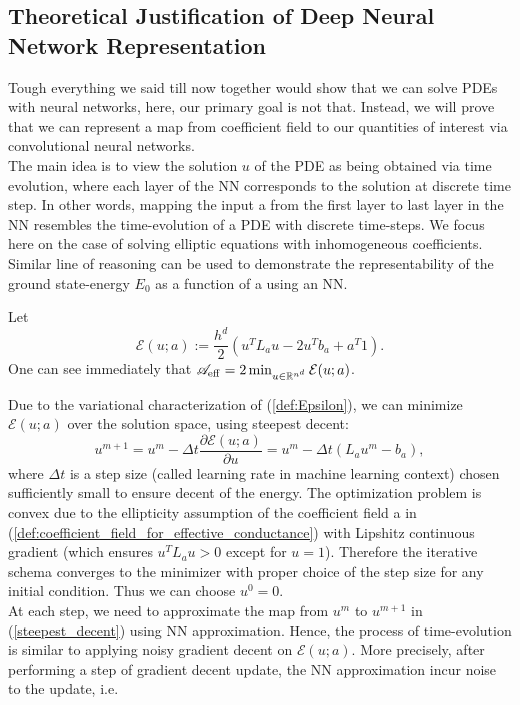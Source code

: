 \subsection{Theoretical Justification of Deep Neural Network Representation}
Tough everything we said till now together would show that we can solve PDEs with neural networks, here, our primary goal is not that. Instead, we will prove that we can represent a map from coefficient field to our quantities of interest via convolutional neural networks.\\
The main idea is to view the solution $u$ of the PDE as being obtained via time evolution, where each layer of the NN corresponds to the solution at discrete time step. In other words, mapping the input a from the first layer to last layer in the NN resembles the time-evolution of a PDE with discrete time-steps. We focus here on the case of solving elliptic equations with inhomogeneous coefficients. Similar line of reasoning can be used to demonstrate the representability of the ground state-energy $E_0$ as a function of a using an NN.
\begin{notation}
	Let 
	\begin{equation}
	\label{def:Epsilon}
	\mathcal{E}(u;a) := \frac{h^d}{2} (u^T L_a u - 2u^T b_a + a^T 1).
	\end{equation} 
	One can see immediately that $\mathscr{A}_{\operatorname{eff}} = 2 \min_{u\in \mathbb{R}^{n^d}} \mathcal{E}(u;a)$.
\end{notation} 
Due to the variational characterization of (\ref{def:Epsilon}), we can minimize $\mathcal{E}(u;a)$ over the solution space, using steepest decent:
\begin{equation}
\label{steepest_decent}
u^{m+1} = u^m - \Delta t \frac{\partial \mathcal{E}(u;a)}{\partial u} = u^m - \Delta t( L_a u^m - b_a),
\end{equation}
where $\Delta t$ is a step size (called learning rate in machine learning context) chosen sufficiently small to ensure decent of the energy. The optimization problem is convex due to the ellipticity assumption of the coefficient field a in (\ref{def:coefficient_field_for_effective_conductance}) with Lipshitz continuous gradient (which ensures $u^T L_a u > 0$ except for $u=1$). Therefore the iterative schema converges to the minimizer with proper choice of the step size for any initial condition. Thus we can choose $u^0 = 0$.\\
At each step, we need to approximate the map from $u^m$ to $u^{m+1}$ in (\ref{steepest_decent}) using NN approximation. Hence, the process of time-evolution is similar to applying noisy gradient decent on $\mathcal{E}(u;a)$. More precisely, after performing a step of gradient decent update, the NN approximation incur noise to the update, i.e.
